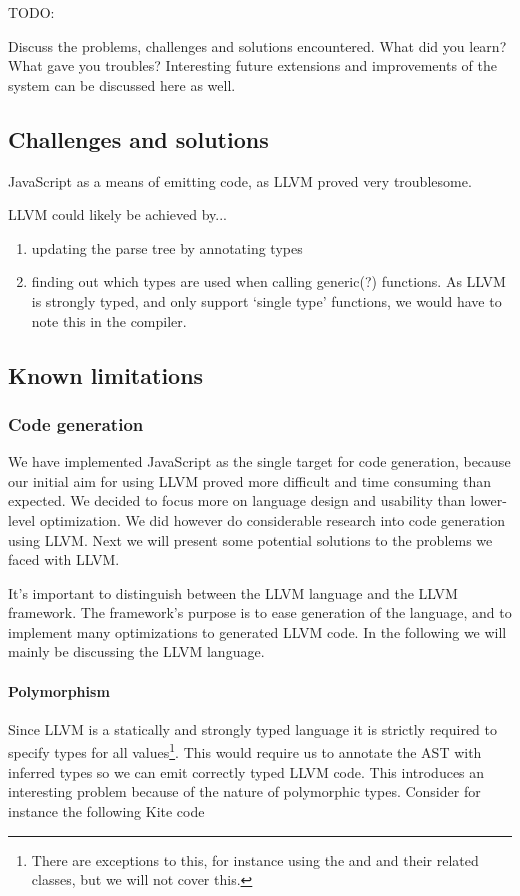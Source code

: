 
TODO:

Discuss the problems, challenges and solutions encountered. What did you learn? What gave you troubles? Interesting future extensions and improvements of the system can be discussed here as well.

\subsection{Challenges and solutions}
JavaScript as a means of emitting code, as LLVM proved very troublesome.

LLVM could likely be achieved by...
\begin{enumerate}
  \item updating the parse tree by annotating types
  \item finding out which types are used when calling generic(?) functions. As LLVM is strongly typed, and only support `single type' functions, we would have to note this in the compiler.
\end{enumerate}


\subsection{Known limitations}

\subsubsection{Code generation}
We have implemented JavaScript as the single target for code generation, because our initial aim for using LLVM proved more difficult and time consuming than expected. We decided to focus more on language design and usability than lower-level optimization. We did however do considerable research into code generation using LLVM. Next we will present some potential solutions to the problems we faced with LLVM.

It's important to distinguish between the LLVM language and the LLVM framework. The framework's purpose is to ease generation of the language, and to implement many optimizations to generated LLVM code. In the following we will mainly be discussing the LLVM language.

\paragraph{Polymorphism}
Since LLVM is a statically and strongly typed language it is strictly required to specify types for all values\footnote{There are exceptions to this, for instance using the  and  and their related classes, but we will not cover this.}. This would require us to annotate the AST with inferred types so we can emit correctly typed LLVM code. This introduces an interesting problem because of the nature of polymorphic types. Consider for instance the following Kite code

